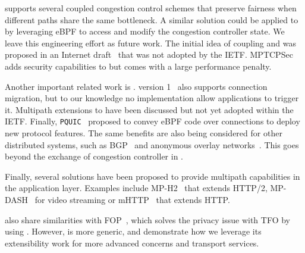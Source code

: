 \mptcp \cite{raiciu2012hard,rfc6824} supports several coupled congestion
control schemes \cite{peng2014multipath,wischik2011design,khalili2013mptcp}
that preserve fairness when different paths share the same bottleneck. A
similar solution  could be applied to \tcpls by leveraging eBPF to access and
modify the  congestion controller state. We leave this engineering effort as
future work. The initial idea of coupling \mptcp and \tls was proposed in an
Internet draft~\cite{draft-paasch-mptcp-ssl-00} that was not adopted by the
IETF. MPTCPSec~\cite{jadin2017securing} adds security capabilities to \mptcp but
comes with a large performance penalty.

Another important related work is \quic. %
\quic version 1~\cite{rfc9000} also supports connection migration, but to our knowledge no implementation allow applications to trigger  it. %
Multipath extensions
\cite{viernickel2018multipath,de2017multipath,draft-liu-multipath-quic-02}
to \quic have been discussed but not yet adopted within the IETF. Finally,
\texttt{PQUIC}~\cite{de2019pluginizing} proposed to convey eBPF code over \quic
connections to deploy new protocol features. The same benefits are also being
considered for other distributed systems, such as BGP~\cite{xBGP} and
anonymous overlay networks~\cite{fan-hotpets}. This goes beyond the exchange of
congestion controller in \tcpls.

Finally, several solutions have been proposed to provide multipath capabilities
in the application layer. Examples include MP-H2~\cite{nikravesh2019mp} that
extends HTTP/2, MP-DASH~\cite{han2016mp} for video streaming or mHTTP~\cite{kim2014multi} that extends HTTP.

\tcpls also share similarities with \tls FOP~\cite{sy2020enhanced}, which
solves the privacy issue with TFO by using \tls. However, \tcpls is more generic, and demonstrate how we leverage its extensibility work for more advanced  concerns and transport services.


